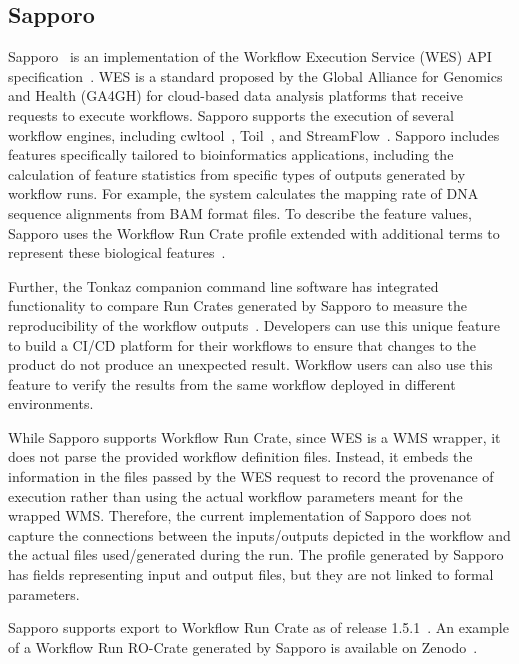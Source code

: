\subsection{Sapporo}\label{wrroc:sapporo}

Sapporo~\cite{Suetake 2022a} is an implementation of the Workflow Execution Service (WES) API specification~\cite{Rehm 2021}.
WES is a standard proposed by the Global Alliance for Genomics and Health (GA4GH) for cloud-based data analysis platforms that receive requests to execute workflows.
Sapporo supports the execution of several workflow engines, including cwltool~\cite{Amstutz 2023}, Toil~\cite{Vivian 2017}, and StreamFlow~\cite{Colonnelli 2021}.
Sapporo includes features specifically tailored to bioinformatics applications, including the calculation of feature statistics from specific types of outputs generated by workflow runs.
For example, the system calculates the mapping rate of DNA sequence alignments from BAM format files.
To describe the feature values, Sapporo uses the Workflow Run Crate profile extended with additional terms to represent these biological features~\cite{sapporo-terms}.

Further, the Tonkaz companion command line software has integrated functionality to compare Run Crates generated by Sapporo to measure the reproducibility of the workflow outputs~\cite{Suetake 2023}.
Developers can use this unique feature to build a CI/CD platform for their workflows to ensure that changes to the product do not produce an unexpected result.
Workflow users can also use this feature to verify the results from the same workflow deployed in different environments.

While Sapporo supports Workflow Run Crate, since WES is a WMS wrapper, it does not parse the provided workflow definition files. 
Instead, it embeds the information in the files passed by the WES request to record the provenance of execution rather than using the actual workflow parameters meant for the wrapped WMS.
Therefore, the current implementation of Sapporo does not capture the connections between the inputs/outputs depicted in the workflow and the actual files used/generated during the run.
The profile generated by Sapporo has fields representing input and output files, but they are not linked to formal parameters.

Sapporo supports export to Workflow Run Crate as of release 1.5.1~\cite{Suetake 2023b}. An example of a Workflow Run RO-Crate generated by Sapporo is available on Zenodo~\cite{Ohta 2023}.

